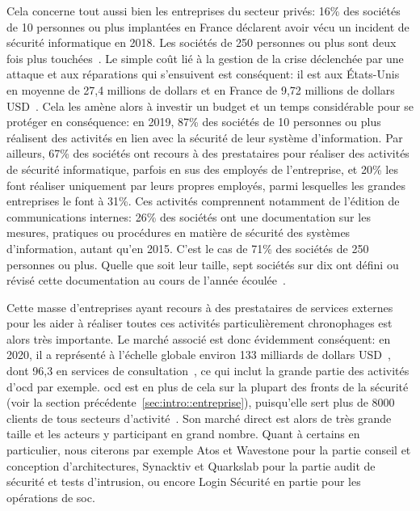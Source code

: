 \documentclass[12pt, oneside, a4paper, titlepage]{report}
\begin{document}
Cela concerne tout aussi bien les entreprises du secteur privés: 16\% des
sociétés de 10 personnes ou plus implantées en France déclarent avoir vécu un
incident de sécurité informatique en 2018. Les sociétés de 250 personnes ou plus
sont deux fois plus touchées~\cite{companies-security}. Le simple coût lié à la
gestion de la crise déclenchée par une attaque et aux réparations qui
s'ensuivent est conséquent: il est aux États-Unis en moyenne de 27,4 millions de
dollars et en France de 9,72 millions de dollars USD~\cite{attack-costs}. Cela
les amène alors à investir un budget et un temps considérable pour se protéger
en conséquence: en 2019, 87\% des sociétés de 10 personnes ou plus réalisent des
activités en lien avec la sécurité de leur système d'information. Par ailleurs,
67\% des sociétés ont recours à des prestataires pour réaliser des activités de
sécurité informatique, parfois en sus des employés de l'entreprise, et 20\% les
font réaliser uniquement par leurs propres employés, parmi lesquelles les
grandes entreprises le font à 31\%. Ces activités comprennent notamment de
l'édition de communications internes: 26\% des sociétés ont une documentation
sur les mesures, pratiques ou procédures en matière de sécurité des systèmes
d'information, autant qu'en 2015. C'est le cas de 71\% des sociétés de 250
personnes ou plus. Quelle que soit leur taille, sept sociétés sur dix ont défini
ou révisé cette documentation au cours de l'année
écoulée~\cite{companies-security}.

Cette masse d'entreprises ayant recours à des prestataires de services externes
pour les aider à réaliser toutes ces activités particulièrement chronophages est
alors très importante. Le marché associé est donc évidemment conséquent: en
2020, il a représenté à l'échelle globale environ 133 milliards de dollars
USD~\cite{security-market}, dont 96,3 en services de
consultation~\cite{security-consulting-market}, ce qui inclut la grande partie
des activités d'\gls{ocd} par exemple. \acrlong{ocd} est en plus de cela sur la
plupart des fronts de la sécurité (voir la section
précédente~\ref{sec:intro::entreprise}), puisqu'elle sert plus de 8000 clients
de tous secteurs d'activité~\cite{ocd}. Son marché direct est alors de très
grande taille et les acteurs y participant en grand nombre. Quant à certains en
particulier, nous citerons par exemple Atos et Wavestone pour la partie conseil
et conception d'architectures, Synacktiv et Quarkslab pour la partie audit de
sécurité et tests d'intrusion, ou encore Login Sécurité en partie pour les
opérations de \gls{soc}.
\end{document}
